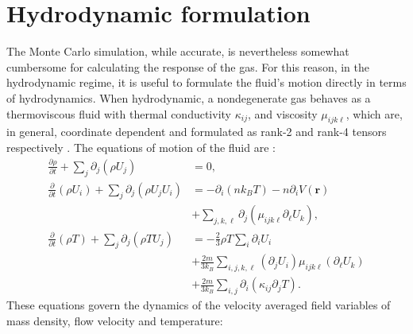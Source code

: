 \documentclass[reprint, amsmath, amssymb, aps, superscriptaddress]{revtex4-1}
\begin{document}
\twocolumngrid








\section{ Hydrodynamic formulation \label{sec:hydrodynamic_formulation} }

The Monte Carlo simulation, while accurate, is nevertheless somewhat cumbersome for calculating the response of the gas.  For this reason, in the hydrodynamic regime, it is useful to formulate the fluid's motion directly in terms of hydrodynamics.
When hydrodynamic, a nondegenerate gas behaves as a thermoviscous fluid \cite{Griffin97_PRL, Nikuni98_JLTP, Kavoulakis98_PRA} with thermal conductivity $\kappa_{i j}$, and viscosity $\mu_{i j k \ell}$, which are, in general, coordinate dependent and formulated as rank-2 and rank-4 tensors respectively \cite{deGroot13_DP}. 
The equations of motion of the fluid are \cite{Fetter03_Dover}:
\begin{subequations} \label{eq:continuum_conservation_laws_trapped}
\begin{align} \label{eq:continuity}
    \frac{ \partial \rho }{ \partial t } 
    +
    \sum_j \partial_j \left( { \rho U_j } \right) 
    &= 
    0, \\ \label{eq:Navier_Stokes}
    \frac{\partial}{\partial t} \left( \rho U_i \right) 
    +
    \sum_j \partial_j \left( \rho U_j U_i \right) 
    &= 
    -
    \partial_i 
    \left( n k_B T \right)
    - 
    n \partial_i V(\boldsymbol{r}) \nonumber\\ 
    & +
    \sum_{j, k, \ell} 
    \partial_j 
    \left( \mu_{ i j k \ell } \partial_{\ell} U_k \right), \\ \label{eq:temperature_balance}
    \frac{\partial}{\partial t} (\rho T) 
    +
    \sum_j \partial_j \left( \rho T U_j \right) 
    &= 
    -
    \frac{ 2 }{ 3 }
    \rho T
    \sum_i \partial_i U_i \nonumber\\
    & +
    \frac{ 2 m }{ 3 k_B } 
    \sum_{i, j, k, \ell} 
    ( \partial_j U_i )
    \mu_{ i j k \ell }
    ( \partial_{\ell} U_k )
    \nonumber\\
    & +
    \frac{ 2 m }{ 3 k_B } 
    \sum_{i, j} 
    \partial_i \left( \kappa_{i j} \partial_j T \right).
\end{align}
\end{subequations}
These equations govern the dynamics of the velocity averaged field variables of mass density, flow velocity and temperature:
\end{document}
